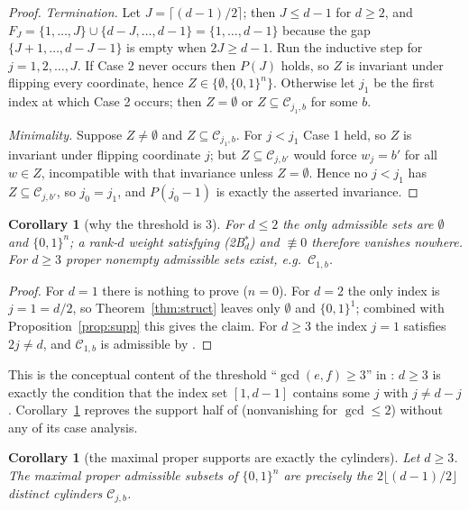 \documentclass[11pt]{article}
\newtheorem{corollary}[theorem]{Corollary}
\theoremstyle{definition}
\theoremstyle{remark}
\newcommand{\Cset}{\mathcal{C}}
\newcommand{\cube}{\{0,1\}}
\begin{document}
\begin{proof}
\emph{Termination.}  Let $J=\lceil (d-1)/2\rceil$; then $J\le d-1$ for $d\ge2$, and
$F_J=\{1,\dots,J\}\cup\{d-J,\dots,d-1\}=\{1,\dots,d-1\}$ because the gap $\{J+1,\dots,d-J-1\}$
is empty when $2J\ge d-1$.  Run the inductive step for $j=1,2,\dots,J$.  If Case 2 never occurs
then $P(J)$ holds, so $Z$ is invariant under flipping every coordinate, hence
$Z\in\{\emptyset,\cube^{n}\}$.  Otherwise let $j_1$ be the first index at which Case 2 occurs;
then $Z=\emptyset$ or $Z\subseteq\Cset_{j_1,b}$ for some $b$.

\emph{Minimality.}  Suppose $Z\ne\emptyset$ and $Z\subseteq\Cset_{j_1,b}$.  For $j<j_1$ Case 1
held, so $Z$ is invariant under flipping coordinate $j$; but $Z\subseteq\Cset_{j,b'}$ would force
$w_j=b'$ for all $w\in Z$, incompatible with that invariance unless $Z=\emptyset$.  Hence no
$j<j_1$ has $Z\subseteq\Cset_{j,b'}$, so $j_0=j_1$, and $P(j_0-1)$ is exactly the asserted
invariance.
\end{proof}

\begin{corollary}[why the threshold is $3$]\label{cor:three}
For $d\le2$ the only admissible sets are $\emptyset$ and $\cube^{n}$; a rank-$d$ weight
satisfying \textnormal{(2B$^*_d$)} and $\not\equiv0$ therefore vanishes nowhere.  For $d\ge3$
proper nonempty admissible sets exist, e.g.\ $\Cset_{1,b}$.
\end{corollary}

\begin{proof}
For $d=1$ there is nothing to prove ($n=0$).  For $d=2$ the only index is $j=1=d/2$, so
Theorem~\ref{thm:struct} leaves only $\emptyset$ and $\cube^{1}$; combined with
Proposition~\ref{prop:supp} this gives the claim.  For $d\ge3$ the index $j=1$ satisfies
$2j\ne d$, and $\Cset_{1,b}$ is admissible by \cite[Lemma 6.5]{Q150c1}.
\end{proof}

This is the conceptual content of the threshold ``$\gcd(e,f)\ge3$'' in \cite[Thm.~1.4]{Q150c1}:
$d\ge3$ is exactly the condition that the index set $[1,d-1]$ contains some $j$ with
$j\ne d-j$.  Corollary~\ref{cor:three} reproves the support half of \cite[Thm.~6.1]{Q150c1}
(nonvanishing for $\gcd\le2$) without any of its case analysis.

\begin{corollary}[the maximal proper supports are exactly the cylinders]\label{cor:maximal}
Let $d\ge3$.  The maximal proper admissible subsets of $\cube^{n}$ are precisely the
$2\lfloor(d-1)/2\rfloor$ distinct cylinders $\Cset_{j,b}$.
\end{corollary}
\end{document}
